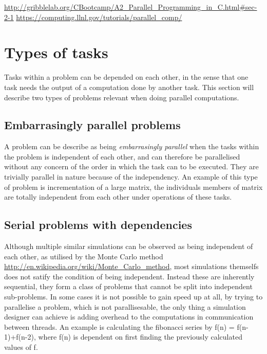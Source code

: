 \url{http://gribblelab.org/CBootcamp/A2_Parallel_Programming_in_C.html#sec-2-1}
\url{https://computing.llnl.gov/tutorials/parallel_comp/}

\section{Types of tasks}
\label{top}

Tasks within a problem can be depended on each other, in the sense that one task needs the output of a computation done by another task. This section will describe two types of problems relevant when doing parallel computations.

\subsection{Embarrasingly parallel problems}
  A problem can be describe as being \emph{embarrasingly parallel} when the tasks within the problem is independent of each other, and can therefore be parallelised without any concern of the order in which the task can to be executed. They are trivially parallel in nature because of the independency.
  An example of this type of problem is incrementation of a large matrix, the individuals members of matrix are totally independent from each other under operations of these tasks.

\subsection{Serial problems with dependencies}
  Although multiple similar simulations can be observed as being independent of each other, as utilised by the Monte Carlo method \url{http://en.wikipedia.org/wiki/Monte_Carlo_method}, most simulations themselfs does not satify the condition of being independent. Instead these are inherently sequential, they form a class of problems that cannot be split into independent sub-problems. In some cases it is not possible to gain speed up at all, by trying to parallelise a problem, which is not parallisesable, the only thing a simulation designer can achieve is adding overhead to the computations in communication between threads.
  An example is calculating the fibonacci series by f(n) = f(n-1)+f(n-2), where f(n) is dependent on first finding the previously calculated values of f.
